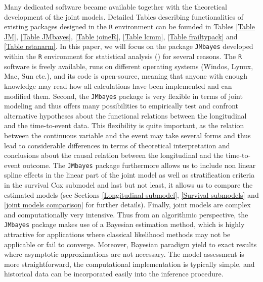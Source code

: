 \documentclass[12pt]{article}
\begin{document}
Many dedicated software became available together with the theoretical development of the joint models. Detailed Tables describing functionalities of existing packages designed in the \texttt{R} environment can be founded in Tables \ref{Table JM}, \ref{Table JMbayes}, \ref{Table joineR}, \ref{Table lcmm}, \ref{Table frailtypack} and \ref{Table rstanarm}. In this paper, we will focus on the package \texttt{JMbayes} developed within the \texttt{R} environment for statistical analysis (\cite{R}) for several reasons. The \texttt{R} software is freely available, runs on different operating systems (Windos, Lynux, Mac, Sun etc.), and its code is open-source, meaning that anyone with enough knowledge may read how all calculations have been implemented and can modified them. Second, the \texttt{JMbayes} package is very flexible in terms of joint modeling and thus offers many possibilities to empirically test and confront alternative hypotheses about the functional relations between the longitudinal and the time-to-event data. This flexibility is quite important, as the relation between the continuous variable and the event may take several forms and thus lead to considerable differences in terms of theoretical interpretation and conclusions about the causal relation between the longitudinal and the time-to-event outcome. The \texttt{JMbayes} package furthermore allows us to include non linear spline effects in the linear part of the joint model as well as stratification criteria in the survival Cox submodel and last but not least, it allows us to compare the estimated models (see Sections \ref{Longitudinal submodel}, \ref{Survival submodels} and \ref{joint models comparison} for further details). Finally, joint models are complex and computationally very intensive. Thus from an algorithmic perspective, the \texttt{JMbayes} package makes use of a Bayesian estimation method, which is highly attractive for applications where classical likelihood methods may not be applicable or fail to converge. Moreover, Bayesian paradigm yield to exact results where asymptotic approximations are not necessary. The model assessment is more straightforward, the computational implementation is typically simple, and historical data can be incorporated easily into the inference procedure.
\end{document}
